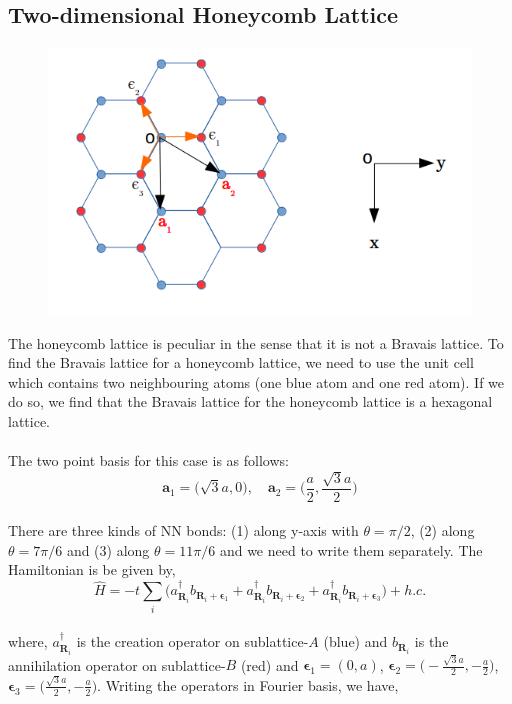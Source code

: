 \documentclass{article}
\begin{document}
\subsection{Two-dimensional Honeycomb Lattice}

\begin{figure}[H]
\centering
\includegraphics[scale = 0.5]{hc_img_full.png}
\end{figure}

The honeycomb lattice is peculiar in the sense that it is not a Bravais lattice. To find the Bravais lattice for a honeycomb lattice, we need to use the unit cell which contains two neighbouring atoms (one blue atom and one red atom). If we do so, we find that the Bravais lattice for the honeycomb lattice is a hexagonal lattice.
\\\\
The two point basis for this case is as follows: 
\\
\begin{equation}
\textbf{a}_1 = \big(\sqrt{3}a, 0\big), \quad \textbf{a}_2 = \Big(\frac{a}{2}, \frac{\sqrt{3}a}{2}\Big)
\end{equation}
\\
There are three kinds of NN bonds: (1) along y-axis with $\theta = \pi/2$, (2) along $\theta = 7\pi/6$ and (3) along $\theta = 11\pi/6$ and we need to write them separately. The Hamiltonian is be given by,
\begin{equation}
\hat{H} = -t \sum_{i} \big( a_{\textbf{R}_i}^\dagger b_{\textbf{R}_i + \boldsymbol{\epsilon}_1} +  a_{\textbf{R}_i}^\dagger b_{\textbf{R}_i + \boldsymbol{\epsilon}_2} +  a_{\textbf{R}_i}^\dagger b_{\textbf{R}_i + \boldsymbol{\epsilon}_3}\big)  + h.c.
\end{equation}
\\
where, $a_{\textbf{R}_i}^\dagger$ is the creation operator on sublattice-$A$ (blue) and $b_{\textbf{R}_i}$ is the annihilation operator on sublattice-$B$ (red) and $\boldsymbol{\epsilon}_1 = (0,a)$, $\boldsymbol{\epsilon}_2 = \Big(-\frac{\sqrt{3}a}{2}, -\frac{a}{2}\Big)$, $\boldsymbol{\epsilon}_3 = \Big(\frac{\sqrt{3}a}{2}, -\frac{a}{2}\Big)$. Writing the operators in Fourier basis, we have, 
\end{document}
